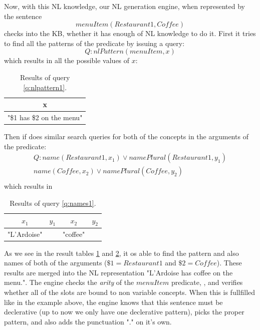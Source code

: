 Now, with this NL knowledge, our NL generation engine, when represented by
the sentence 
\begin{equation}
\label{nl:menuItem1}
menuItem(Restaurant1,Coffee)
\end{equation}
checks into the KB, whether it 
has enough of NL knowledge to do it. First it tries to find all the patterns
of the predicate by issuing a query:
\begin{equation}\label{q:nlpattern1}
Q:nlPattern(menuItem,x)
\end{equation}
which results in all the possible values of $x$:
\begin{table}[H]
\centering
\caption{Results of query \ref{q:nlpattern1}.}
\label{tab:results1}
\begin{tabular}{|c|}
	\hline
	\textbf{x} \\
    \hline
    "\$1 has \$2 on the menu" \\
    \hline
\end{tabular}
\end{table}
Then if does similar search queries for both of the concepts in the arguments
of the predicate:
\begin{equation}\label{q:names1}
\begin{gathered}
Q:name(Restaurant1,x_1) \lor namePlural(Restaurant1,y_1)\\
name(Coffee,x_2) \lor namePlural(Coffee,y_2)\\
\end{gathered}
\end{equation}
which results in
\begin{table}[H]
\centering
\caption{Results of query \ref{q:names1}.}
\label{tab:results2}
\begin{tabular}{|c|c|c|c|}
	\hline
	\textbf{$x_1$} & \textbf{$y_1$} & \textbf{$x_2$} & \textbf{$y_2$}\\
    \hline
    "L'Ardoise" & & "coffee" & \\
    \hline
\end{tabular}
\end{table}
As we see in the result tables \ref{tab:results1} and \ref{tab:results2}, it
os able to find the pattern and also names of both of the arguments 
($\$1=Restaurant1$ and $\$2=Coffee$). These results are merged into the 
NL representation "L'Ardoise has coffee on the menu.". 
The engine checks the \emph{arity} of the $menuItem$ predicate, ,
and verifies whether all of the slots are bound to non variable concepts. When
this is fullfilled like in the example above, the engine knows that this 
sentence must be declerative (up to now we only have one declerative pattern), 
picks the proper pattern, and also adds the punctuation "." on it's own.


